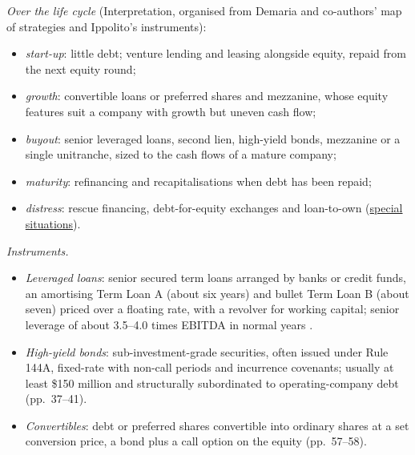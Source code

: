 \begin{qfmethod}\label{meth:private-debt-financing-structures}
 \emph{Over the life cycle} (Interpretation, organised from Demaria and co-authors' map of strategies \citep[p.~58, Fig.~3.2]{demaria-private-markets-2021} and Ippolito's instruments):
\begin{itemize}
\item \emph{start-up}: little debt; venture lending and leasing alongside equity, repaid from the next equity round;
\item \emph{growth}: convertible loans or preferred shares and mezzanine, whose equity features suit a company with growth but uneven cash flow;
\item \emph{buyout}: senior leveraged loans, second lien, high-yield bonds, mezzanine or a single unitranche, sized to the cash flows of a mature company;
\item \emph{maturity}: refinancing and recapitalisations when debt has been repaid;
\item \emph{distress}: rescue financing, debt-for-equity exchanges and loan-to-own (\hyperref[meth:special-situations-distressed]{special situations}).
\end{itemize}

\emph{Instruments.}
\begin{itemize}
\item \emph{Leveraged loans}: senior secured term loans arranged by banks or credit funds, an amortising Term Loan A (about six years) and bullet Term Loan B (about seven) priced over a floating rate, with a revolver for working capital; senior leverage of about 3.5--4.0 times EBITDA in normal years \citep[pp.~31--32, 192--193]{ippolito-private-capital-2020}.
\item \emph{High-yield bonds}: sub-investment-grade securities, often issued under Rule 144A, fixed-rate with non-call periods and incurrence covenants; usually at least \$150 million and structurally subordinated to operating-company debt (pp.~37--41).
\item \emph{Convertibles}: debt or preferred shares convertible into ordinary shares at a set conversion price, a bond plus a call option on the equity (pp.~57--58).
\end{itemize}


\end{qfmethod}
